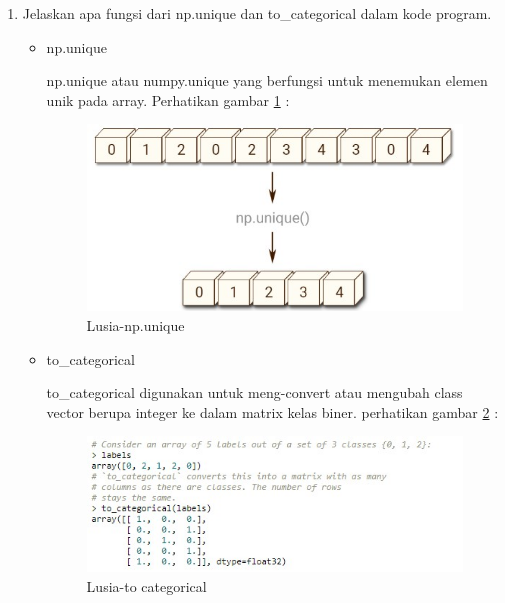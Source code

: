 \begin{enumerate}
\item Jelaskan apa fungsi dari np.unique dan to\_categorical dalam kode program.
	\begin{itemize}
	\item np.unique 
		\par np.unique atau numpy.unique yang berfungsi untuk menemukan elemen unik pada array. Perhatikan gambar \ref{6A7} :
		\begin{figure}[!hbtp]
		\centering
		\includegraphics[scale=0.4]{figures/s7a.jpg}
		\caption{Lusia-np.unique}
		\label{6A7}
		\end{figure}
	\item to\_categorical
		\par to\_categorical digunakan untuk meng-convert atau mengubah class vector berupa integer ke dalam matrix kelas biner. perhatikan gambar \ref{6A8} :
		\begin{figure}[!hbtp]
		\centering
		\includegraphics[scale=0.4]{figures/s7b.jpg}
		\caption{Lusia-to categorical}
		\label{6A8}
		\end{figure}
	\end{itemize}
	

\end{enumerate}
